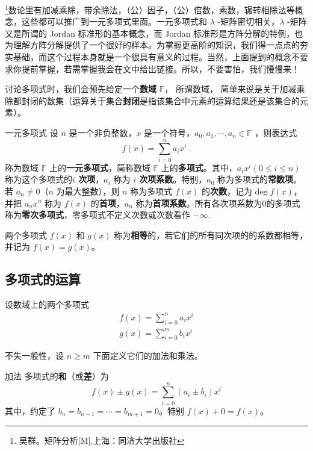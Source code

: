 
\footnote{吴群。矩阵分析[M].上海：同济大学出版社}数论里有加减乘除，带余除法，（公）因子，（公）倍数，素数，辗转相除法等概念，这些都可以推广到一元多项式里面。一元多项式和 $\lambda$ -矩阵密切相关，$\lambda$ -矩阵又是所谓的 Jordan 标准形的基本概念，而 Jordan 标准形是方阵分解的特例，也为理解方阵分解提供了一个很好的样本。为掌握更高阶的知识，我们得一点点的夯实基础，而这个过程本身就是一个很具有意义的过程。当然，上面提到的概念不要求你提前掌握，若需掌握我会在文中给出链接。所以，不要害怕，我们慢慢来！

讨论多项式时，我们会预先给定一个\textbf{数域} $\mathbb{F}$， 所谓数域， 简单来说是关于加减乘除都封闭的数集（运算关于集合\textbf{封闭}是指该集合中元素的运算结果还是该集合的元素）。
\begin{definition}{一元多项式}\label{OnePol_def1}
设 $n$ 是一个非负整数，$x$ 是一个符号，$a_0,a_1,\cdots,a_n\in \mathbb{F}$ ，则表达式
\begin{equation}
f(x)=\sum_{i=0}^{n}a_i x^i~.
\end{equation}
称为数域 $\mathbb{F}$ 上的\textbf{一元多项式}，简称数域 $\mathbb{F}$ 上的\textbf{多项式}。其中，$a_ix^i(0\leq i\leq n)$ 称为这个多项式的\textbf{$i$ 次项}，$a_i$ 称为 \textbf{$i$ 次项系数}。特别，$a_0$ 称为多项式的\textbf{常数项}。若 $a_n\neq 0$（$n$ 为最大整数），则 $n$ 称为多项式 $f(x)$ 的\textbf{次数}，记为 $\mathrm{deg}\;f(x)$，并把 $a_nx^n$ 称为 $f(x)$ 的\textbf{首项}，$a_n$ 称为\textbf{首项系数}。所有各次项系数为0的多项式称为\textbf{零次多项式}，零多项式不定义次数或次数看作 $-\infty$.
\end{definition}
两个多项式 $f(x)$ 和 $g(x)$ 称为\textbf{相等}的，若它们的所有同次项的的系数都相等，并记为 $f(x)=g(x)$。
\subsection{多项式的运算}
设数域上的两个多项式
\begin{equation}
\begin{aligned}
f(x)=\sum_{i=0}^{n}a_ix^i\\
g(x)=\sum_{i=0}^{m}b_ix^i
\end{aligned}
\end{equation}

不失一般性，设 $n\geq m$
下面定义它们的加法和乘法。
\begin{definition}{加法}
多项式的\textbf{和}（或\textbf{差}）为
\begin{equation}
f(x)\pm g(x)=\sum_{i=0}^n (a_i\pm b_i)x^i
\label{OnePol_eq1}
\end{equation}
其中，约定了 $b_n=b_{n-1}=\cdots=b_{m+1}=0$。特别 $f(x)+0=f(x)$。
\end{definition}

